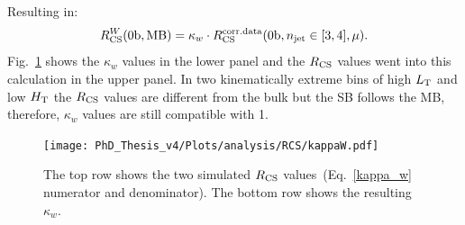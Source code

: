 Resulting in:
\begin{equation}
R_{\rm CS}^{W}({\rm 0b},{\rm MB}) = {\kappa_w}\cdot{\ensuremath{R_{\rm CS}}^{\rm corr. data}({\rm 0b},\ensuremath{n_{\rm jet}}\in [3,4], \mu)}.
\end{equation}
Fig.~\ref{fig:kappaW} shows the $\kappa_w$ values in the lower panel and the $R_{\rm CS}$ values went into this calculation in the upper panel. In two kinematically extreme bins of high $L_{\rm T}$ and low $H_{\rm T}$ the $R_{\rm CS}$ values are different from the bulk but the SB follows the MB, therefore, $\kappa_w$ values are still compatible with 1.
\begin{figure}[!hbt]
    \begin{center}
 \texttt{[image: PhD\_Thesis\_v4/Plots/analysis/RCS/kappaW.pdf]}
  \caption{ \label{fig:kappaW} The top row shows the two simulated $R_{\rm CS}$ values~(Eq.~\ref{kappa_w} numerator and denominator). The bottom row shows the resulting $\kappa_w$.}
  \end{center}
\end{figure}
